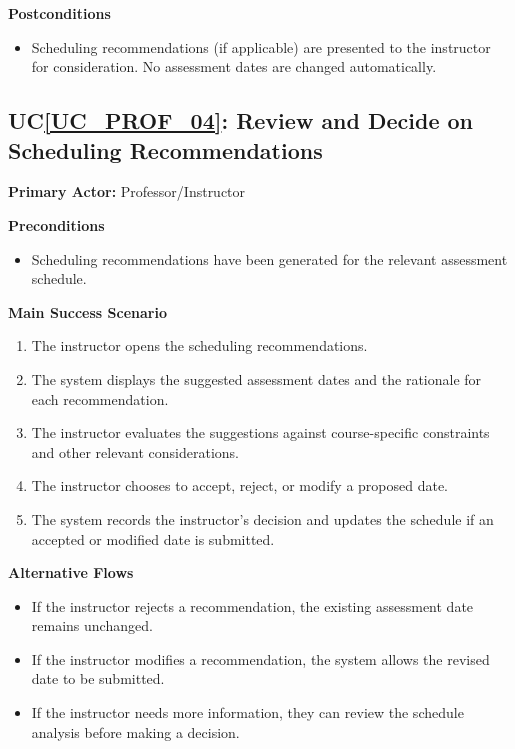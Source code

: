 \documentclass[12pt]{article}
\newcounter{ucnum} %
\newcommand{\ucref}[1]{UC\ref{#1}}
\begin{document}
\noindent \textbf{Postconditions}
\begin{itemize}
  \item Scheduling recommendations (if applicable) are presented to the instructor for consideration. No assessment dates are changed automatically.
\end{itemize}


 \label{UC_PROF_04}
\subsection{\ucref{UC_PROF_04}: Review and Decide on Scheduling Recommendations}

\noindent \textbf{Primary Actor:} Professor/Instructor

\noindent \textbf{Preconditions}
\begin{itemize}
  \item Scheduling recommendations have been generated for the relevant assessment schedule.
\end{itemize}

\noindent \textbf{Main Success Scenario}
\begin{enumerate}
  \item The instructor opens the scheduling recommendations.
  \item The system displays the suggested assessment dates and the rationale for each recommendation.
  \item The instructor evaluates the suggestions against course-specific constraints and other relevant considerations.
  \item The instructor chooses to accept, reject, or modify a proposed date.
  \item The system records the instructor's decision and updates the schedule if an accepted or modified date is submitted.
\end{enumerate}

\noindent \textbf{Alternative Flows}
\begin{itemize}
  \item If the instructor rejects a recommendation, the existing assessment date remains unchanged.
  \item If the instructor modifies a recommendation, the system allows the revised date to be submitted.
  \item If the instructor needs more information, they can review the schedule analysis before making a decision.
\end{itemize}
\end{document}

